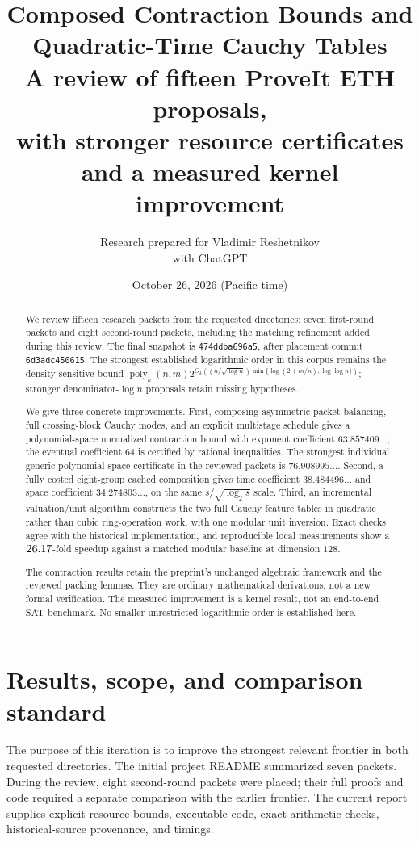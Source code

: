 \documentclass[11pt,letterpaper]{article}
\title{\textbf{Composed Contraction Bounds and\\Quadratic-Time Cauchy Tables}\\[6pt]
\large A review of fifteen ProveIt ETH proposals,\\with stronger resource certificates and a measured kernel improvement}
\author{Research prepared for Vladimir Reshetnikov\\with ChatGPT}
\date{October 26, 2026 (Pacific time)}
\theoremstyle{definition}\newtheorem{definition}[theorem]{Definition}
\theoremstyle{remark}\newtheorem{remark}[theorem]{Remark}
\newcommand{\poly}{\operatorname{poly}}
\begin{document}
\maketitle
\begin{abstract}
We review fifteen research packets from the requested directories: seven
first-round packets and eight second-round packets, including the matching
refinement added during this review. The final snapshot is
\texttt{474ddba696a5}, after placement commit \texttt{6d3adc450615}. The strongest established logarithmic order in this
corpus remains the density-sensitive bound
$\poly_k(n,m)2^{O_k((n/\sqrt{\log n})\min\{\log(2+m/n),\log\log n\})}$;
stronger denominator-$\log n$ proposals retain missing hypotheses.

We give three concrete improvements. First, composing asymmetric packet
balancing, full crossing-block Cauchy modes, and an explicit multistage
schedule gives a polynomial-space normalized contraction bound with exponent
coefficient $63.857409\ldots$; the eventual coefficient $64$ is certified by
rational inequalities. The strongest individual generic polynomial-space
certificate in the reviewed packets is $76.908995\ldots$. Second, a fully
costed eight-group cached composition gives time coefficient
$38.484496\ldots$ and space coefficient $34.274803\ldots$, on the same
$s/\sqrt{\log_2s}$ scale. Third, an incremental valuation/unit algorithm
constructs the two full Cauchy feature tables in quadratic rather than cubic
ring-operation work, with one modular unit inversion. Exact checks agree
with the historical implementation, and reproducible local measurements
show a $26.17$-fold speedup against a matched modular baseline at dimension
$128$.

The contraction results retain the preprint's unchanged algebraic framework
and the reviewed packing lemmas. They are ordinary mathematical derivations,
not a new formal verification. The measured improvement is a kernel result,
not an end-to-end SAT benchmark. No smaller unrestricted logarithmic order
is established here.
\end{abstract}
\clearpage
\tableofcontents
\clearpage

\section{Results, scope, and comparison standard}
\label{sec:scope}

The purpose of this iteration is to improve the strongest relevant frontier
in both requested directories. The initial project README summarized seven packets. During the review,
eight second-round packets were placed; their full proofs and code required
a separate comparison with the earlier frontier.
The current report supplies explicit resource bounds, executable code,
exact arithmetic checks, historical-source provenance, and timings.
\end{document}
